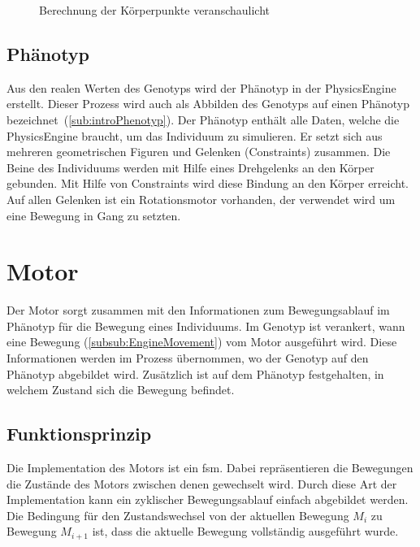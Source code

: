         \begin{figure}[H]
          \centering
          
          \caption{Berechnung der Körperpunkte veranschaulicht\label{fig:kp}}
        \end{figure}

    \subsection{Phänotyp\label{sub:Phenotyp}}

      Aus den realen Werten des Genotyps wird der Phänotyp in der \gls{PhysicsEngine} erstellt.
      Dieser Prozess wird auch als Abbilden des Genotyps auf einen Phänotyp bezeichnet~(\vref{sub:introPhenotyp}).
      Der Phänotyp enthält alle Daten, welche die \gls{PhysicsEngine} braucht, um das Individuum zu simulieren.
      Er setzt sich aus mehreren geometrischen Figuren und Gelenken (\Glspl{Constraint}) zusammen.
      Die Beine des Individuums werden mit Hilfe eines Drehgelenks an den Körper gebunden.
      Mit Hilfe von Constraints wird diese Bindung an den Körper erreicht.
      Auf allen Gelenken ist ein Rotationsmotor vorhanden, der verwendet wird um eine Bewegung in Gang zu setzten.

  \section{Motor\label{sec:Engine}}

    Der Motor sorgt zusammen mit den Informationen zum Bewegungsablauf im Phänotyp für die Bewegung eines Individuums.
    Im Genotyp ist verankert, wann eine Bewegung (\vref{subsub:EngineMovement}) vom Motor ausgeführt wird.
    Diese Informationen werden im Prozess übernommen, wo der Genotyp auf den Phänotyp abgebildet wird.
    Zusätzlich ist auf dem Phänotyp festgehalten, in welchem Zustand sich die Bewegung befindet.

    \subsection{Funktionsprinzip}

      Die Implementation des Motors ist ein \acrfull{fsm}.
      Dabei repräsentieren die Bewegungen die Zustände des Motors zwischen denen gewechselt wird.
      Durch diese Art der Implementation kann ein zyklischer Bewegungsablauf einfach abgebildet werden.
      Die Bedingung für den Zustandswechsel von der aktuellen Bewegung \( M_{i} \) zu Bewegung \( M_{i + 1} \) ist,
      dass die aktuelle Bewegung vollständig ausgeführt wurde.

